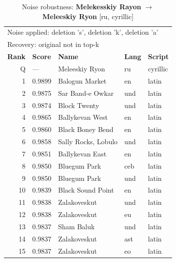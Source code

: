 \begin{table}[htbp]
\centering
\small
\caption{Noise robustness: \textbf{Melekesskiy Rayon} $\rightarrow$ \textbf{Meleeskiy Ryon} [ru, cyrillic]}
\label{tab:noise-18}
\begin{tabular}{rllll}
\toprule
\multicolumn{5}{l}{\small Noise applied: deletion 's', deletion 'k', deletion 'a'} \\
\multicolumn{5}{l}{\small Recovery: original not in top-k} \\
\midrule
\textbf{Rank} & \textbf{Score} & \textbf{Name} & \textbf{Lang} & \textbf{Script} \\
\midrule
\rowcolor{gray!20} Q & --- & Meleeskiy Ryon & ru & cyrillic \\
\midrule
1 & 0.9899 & Balogun Market & en & latin \\
2 & 0.9875 & Sar Band-e Owkar & und & latin \\
3 & 0.9874 & Block Twenty & und & latin \\
4 & 0.9865 & Ballykevan West & en & latin \\
5 & 0.9860 & Black Boney Bend & en & latin \\
6 & 0.9858 & Sally Rocks, Lobulo & und & latin \\
7 & 0.9851 & Ballykevan East & en & latin \\
8 & 0.9850 & Bluegum Park & ceb & latin \\
9 & 0.9850 & Bluegum Park & und & latin \\
10 & 0.9839 & Black Sound Point & en & latin \\
11 & 0.9838 & Zalakoveskut & und & latin \\
12 & 0.9838 & Zalakoveskut & eu & latin \\
13 & 0.9837 & Sham Baluk & und & latin \\
14 & 0.9837 & Zalakoveskut & ast & latin \\
15 & 0.9837 & Zalakoveskut & eo & latin \\
\bottomrule
\end{tabular}
\end{table}

